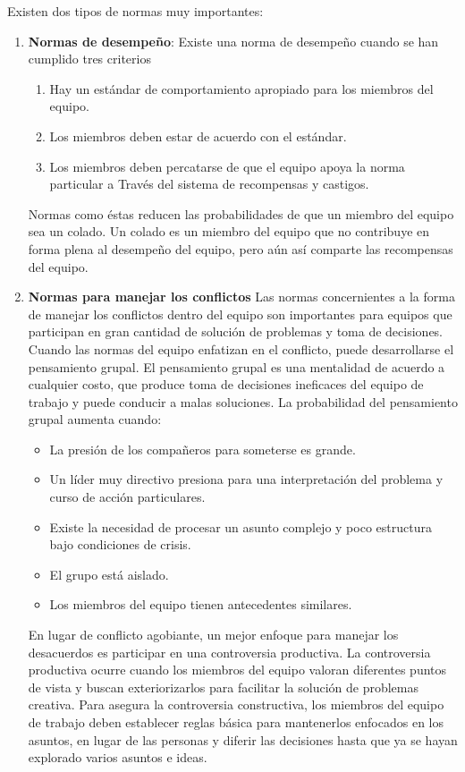 Existen dos tipos de normas muy importantes:

\begin{enumerate}
    \item \textbf{Normas de desempeño}: Existe una norma de desempeño cuando se han cumplido
    tres criterios
    
    \begin{enumerate}
        \item Hay  un estándar de comportamiento apropiado para los miembros del equipo.
        \item Los miembros deben estar de acuerdo con el estándar.
        \item Los miembros deben percatarse de que el equipo apoya la norma particular a 
        Través del sistema de recompensas y castigos.
    \end{enumerate}

    Normas como éstas reducen las probabilidades de que un miembro del equipo sea
    un colado. Un colado es un miembro del equipo que no contribuye en forma plena
    al desempeño del equipo, pero aún así comparte las recompensas del equipo.
    
    \item \textbf{Normas para manejar los conflictos}
    Las normas concernientes a la forma de manejar los conflictos dentro del
    equipo son importantes para equipos que participan en gran cantidad de
    solución de problemas y toma de decisiones. Cuando las normas del equipo
    enfatizan en el conflicto, puede desarrollarse el pensamiento grupal.
    El pensamiento grupal es una mentalidad de acuerdo a cualquier costo,
    que produce toma de decisiones ineficaces del equipo de trabajo y puede
    conducir a malas soluciones. La probabilidad del pensamiento grupal
    aumenta cuando:

    \begin{itemize}
        \item La presión de los compañeros para someterse es grande.
        \item Un líder muy directivo presiona para una interpretación del problema y curso de acción particulares.
        \item Existe la necesidad de procesar un asunto complejo y poco estructura bajo condiciones de crisis.
        \item El grupo está aislado.
        \item Los miembros del equipo tienen antecedentes similares.
    \end{itemize}

    En lugar de conflicto agobiante, un mejor enfoque para manejar los
    desacuerdos es participar en una controversia productiva. La
    controversia productiva ocurre cuando los miembros del equipo
    valoran diferentes puntos de vista y buscan exteriorizarlos para
    facilitar la solución de problemas creativa. Para asegura la
    controversia constructiva, los miembros del equipo de trabajo
    deben establecer reglas básica para mantenerlos enfocados en
    los asuntos, en lugar de las personas y diferir las decisiones
    hasta que ya se hayan explorado varios asuntos e ideas.
\end{enumerate}

